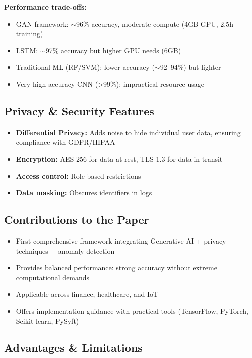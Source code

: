 \textbf{Performance trade-offs:}

\begin{itemize}
    \item GAN framework: $\sim$96\% accuracy, moderate compute (4GB GPU, 2.5h training)
    \item LSTM: $\sim$97\% accuracy but higher GPU needs (6GB)
    \item Traditional ML (RF/SVM): lower accuracy ($\sim$92–94\%) but lighter
    \item Very high-accuracy CNN (>99\%): impractical resource usage
\end{itemize}

\subsection{Privacy \& Security Features}

\begin{itemize}
    \item \textbf{Differential Privacy:} Adds noise to hide individual user data, ensuring compliance with GDPR/HIPAA
    \item \textbf{Encryption:} AES-256 for data at rest, TLS 1.3 for data in transit
    \item \textbf{Access control:} Role-based restrictions
    \item \textbf{Data masking:} Obscures identifiers in logs
\end{itemize}

\subsection{Contributions to the Paper}

\begin{itemize}
    \item First comprehensive framework integrating Generative AI + privacy techniques + anomaly detection
    \item Provides balanced performance: strong accuracy without extreme computational demands
    \item Applicable across finance, healthcare, and IoT
    \item Offers implementation guidance with practical tools (TensorFlow, PyTorch, Scikit-learn, PySyft)
\end{itemize}

\subsection{Advantages \& Limitations}

